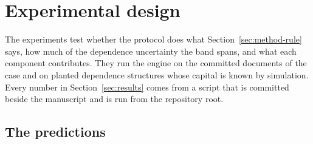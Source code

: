 \section{Experimental design}
\label{sec:experimental-design}

The experiments test whether the protocol does what Section~\ref{sec:method-rule} says, how much of the dependence uncertainty
the band spans, and what each component contributes. They run the engine on the committed documents of the case and on planted
dependence structures whose capital is known by simulation. Every number in Section~\ref{sec:results} comes from a script that
is committed beside the manuscript and is run from the repository root.

\subsection{The predictions}
\label{sec:design-hypotheses}

